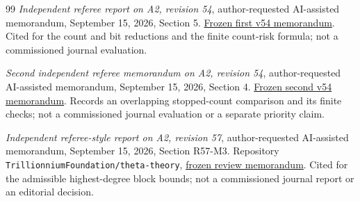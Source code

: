 \begin{thebibliography}{99}
\emph{Independent referee report on A2, revision 54},
author-requested AI-assisted memorandum, September 15, 2026, Section 5.
\href{https://github.com/TrillionniumFoundation/theta-theory/blob/1030ca91a96ca1be8ecd0347ecbdac7084cdd8d4/reviews/a2-v54-independent-harsh-top4-2026-09-15/REFEREE_REPORT.md}{Frozen first v54 memorandum}.
Cited for the count and bit reductions and the finite count-risk formula;
not a commissioned journal evaluation.

\emph{Second independent referee memorandum on A2, revision 54},
author-requested AI-assisted memorandum, September 15, 2026, Section 4.
\href{https://github.com/TrillionniumFoundation/theta-theory/blob/67250d08714acf76274e82158f107246f0de7eee/reviews/a2-v54-second-referee-top4-2026-09-15/REFEREE_REPORT.md}{Frozen second v54 memorandum}.
Records an overlapping stopped-count comparison and its finite checks;
not a commissioned journal evaluation or a separate priority claim.

\emph{Independent referee-style report on A2, revision 57},
author-requested AI-assisted memorandum, September 15, 2026,
Section R57-M3. Repository
\texttt{Trillionnium\allowbreak Foundation/\allowbreak theta-theory},
\href{https://github.com/TrillionniumFoundation/theta-theory/commit/e14138660e716daf60471f3b98e8f1d30cb61a34}{frozen review memorandum}.
Cited for the admissible highest-degree block bounds; not a commissioned
journal report or an editorial decision.

\end{thebibliography}

